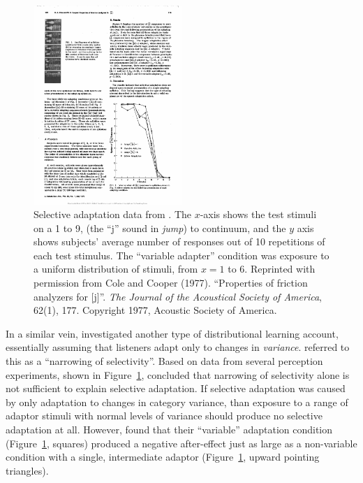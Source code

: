 \begin{figure}[!t]
  \centering
  \includegraphics[width=0.5\textwidth]{cole-cooper-1977-fig3.pdf}
  \caption{Selective adaptation data from \protect\textcite{Cole1977}.  The $x$-axis shows the test stimuli on a 1 to 9,  (the ``j'' sound in \emph{jump}) to  continuum, and the $y$ axis shows subjects' average number of  responses out of 10 repetitions of each test stimulus.  The ``variable adapter'' condition was exposure to a uniform distribution of stimuli, from $x=1$ to 6. Reprinted with permission from Cole and Cooper (1977). ``Properties of friction analyzers for [j]''. \emph{The Journal of the Acoustical Society of America}, 62(1), 177. Copyright 1977, Acoustic Society of America.}
  \label{fig:cole-1977-range-fixed-adaptors}
\end{figure}

In a similar vein, \textcite{Cole1977} investigated another type of distributional learning account, essentially assuming that listeners adapt only to changes in \emph{variance}. \citeauthor{Cole1977} referred to this as a ``narrowing of selectivity''. Based on data from several perception experiments, shown in Figure~\ref{fig:cole-1977-range-fixed-adaptors}, \citeauthor{Cole1977} concluded that narrowing of selectivity alone is not sufficient to explain selective adaptation.  If selective adaptation was caused by only adaptation to changes in category variance, than exposure to a range of adaptor stimuli with normal levels of variance should produce no selective adaptation at all.  However, \textcite{Cole1977} found that their ``variable'' adaptation condition (Figure~\ref{fig:cole-1977-range-fixed-adaptors}, squares) produced a negative after-effect just as large as a non-variable condition with a single, intermediate adaptor (Figure~\ref{fig:cole-1977-range-fixed-adaptors}, upward pointing triangles).

